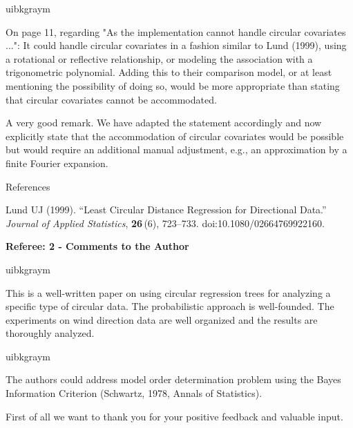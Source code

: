 \documentclass[english, noconfig]{uibklttr}
\newcommand{\section}[1]{{\Large{\textbf{#1}}}}
\newenvironment{re}{
    \begin{color}{uibkgraym}
        \itshape
}{
    \end{color}
}
\begin{document}
\vspace{0.5em}
\begin{re}
On page 11, regarding "As the implementation cannot handle circular
covariates ...": It could handle circular covariates in a fashion similar to
Lund (1999), using a rotational or reflective relationship, or modeling the
association with a trigonometric polynomial. Adding this to their comparison
model, or at least mentioning the possibility of doing so, would be more
appropriate than stating that circular covariates cannot be accommodated.
\end{re}

A very good remark. We have adapted the statement accordingly and now
explicitly state that the accommodation of circular covariates would be
possible but would require an additional manual adjustment, e.g., an approximation by
a finite Fourier expansion.

\vspace{0.5cm}
References

Lund UJ (1999). ``Least Circular Distance Regression for Directional Data.''
\emph{Journal of Applied Statistics}, \textbf{26}\,(6), 723--733.
doi:10.1080/02664769922160.

\newpage

\section{Referee: 2 - Comments to the Author}

\begin{re}
This is a well-written paper on using circular regression trees for analyzing a
specific type of circular data. The probabilistic approach is well-founded. The
experiments on wind direction data are well organized and the results are
thoroughly analyzed.
\end{re}

\begin{re}
The authors could address model order determination problem using the
Bayes Information Criterion (Schwartz, 1978, Annals of Statistics).  
\end{re}

First of all we want to thank you for your positive feedback and valuable input. 
\end{document}
